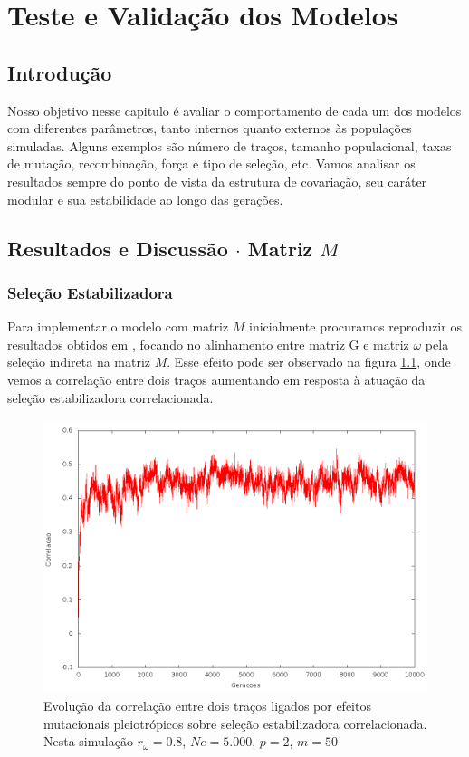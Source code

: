 \pagestyle{empty}
\cleardoublepage
\pagestyle{fancy}
\chapter{Teste e Validação dos Modelos}\label{cap3}

\section{Introdução}

Nosso objetivo nesse capitulo é avaliar o comportamento de cada um dos
modelos com diferentes parâmetros, tanto internos quanto
externos às populações simuladas.
Alguns exemplos são número de traços, tamanho populacional, taxas de
mutação, recombinação, força e tipo de seleção, etc. 
Vamos analisar os resultados sempre do ponto de vista da estrutura de
covariação, seu caráter modular e sua estabilidade ao longo das
gerações.


\section{Resultados e Discussão $\cdot$ Matriz $M$}\label{cap3:ModelM}

\subsection{Seleção Estabilizadora}

Para implementar o modelo com matriz $M$ inicialmente procuramos
reproduzir os resultados obtidos em \cite{Jones2007}, focando no
alinhamento entre matriz G e matriz $\omega$ pela seleção indireta na
matriz $M$. 
Esse efeito pode ser observado na figura \ref{jones2tracos}, onde vemos
a correlação entre dois traços aumentando em resposta à atuação da
seleção estabilizadora correlacionada.  


\begin{figure}[htbp]
  \centering
  \includegraphics[width=150mm, height=80mm]{figuras/jones2tracos.png}
  \caption{Evolução da correlação entre dois traços ligados por efeitos
  mutacionais pleiotrópicos sobre seleção estabilizadora correlacionada.
  Nesta simulação $r_\omega=0.8$, $Ne=5.000$, $p=2$, $m=50$}
  \label{jones2tracos}
\end{figure}


